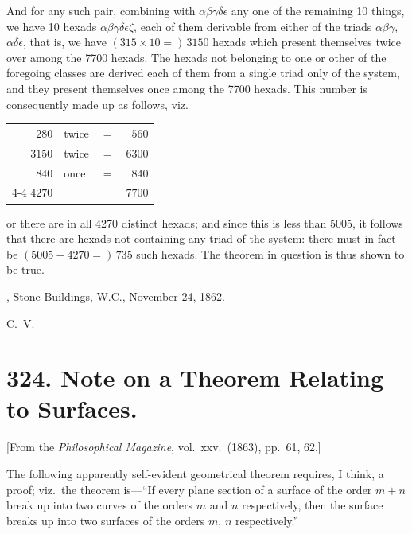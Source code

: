 \documentclass[11pt,a4paper]{article}
\theoremstyle{plain}
\begin{document}
\newpage
And for any such pair, combining with $\alpha\beta\gamma\delta\epsilon$ any one of the remaining 10 things, we have 10 hexads $\alpha\beta\gamma\delta\epsilon\zeta$, each of them derivable from either of the triads $\alpha\beta\gamma$, $\alpha\delta\epsilon$, that is, we have $(315 \times 10 =)\, 3150$ hexads which present themselves twice over among the 7700 hexads. The hexads not belonging to one or other of the foregoing classes are derived each of them from a single triad only of the system, and they present themselves once among the 7700 hexads. This number is consequently made up as follows, viz.
\begin{center}
\begin{tabular}{r@{\ hexads each\ }l@{\ \ }r@{\ }r}
$280$  & twice & $=$ & $560$  \\
$3150$ & twice & $=$ & $6300$ \\
$840$  & once  & $=$ & $840$  \\ \cline{4-4}
$4270$ &       &     & $7700$ \\
\end{tabular}
\end{center}
or there are in all 4270 distinct hexads; and since this is less than 5005, it follows that there are hexads not containing any triad of the system: there must in fact be $(5005 - 4270 =)\, 735$ such hexads. The theorem in question is thus shown to be true.

\medskip
{}, Stone Buildings, W.C., November 24, 1862.

\medskip
\noindent C.\ V.


\newpage
\section*{324. Note on a Theorem Relating to Surfaces.}

[From the \textit{Philosophical Magazine}, vol.\ xxv.\ (1863), pp.\ 61, 62.]

\medskip

The following apparently self-evident geometrical theorem requires, I think, a proof; viz.\ the theorem is---``If every plane section of a surface of the order $m+n$ break up into two curves of the orders $m$ and $n$ respectively, then the surface breaks up into two surfaces of the orders $m$, $n$ respectively.''
\end{document}
